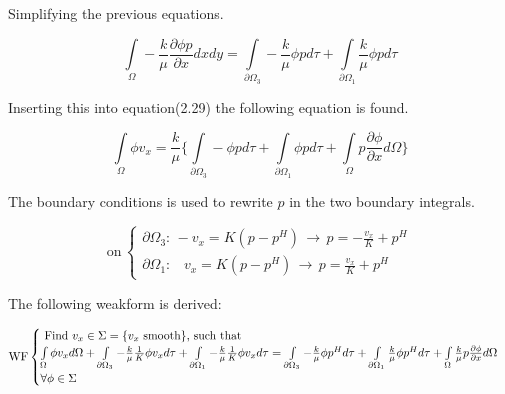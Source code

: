 \documentclass[a4paper]{report}
\begin{document}
Simplifying the previous equations.

\begin{equation}
\int\limits_{\Omega}-\frac{k}{\mu}\frac{\partial \phi p}{\partial x}dxdy =\int\limits_{\partial\Omega_3}-\frac{k}{\mu}\phi pd\tau+\int\limits_{\partial\Omega_1}\frac{k}{\mu}\phi pd\tau
\end{equation}

Inserting this into equation(2.29) the following equation is found.

\begin{equation}
	\int\limits_{\Omega}\phi v_x = \frac{k}{\mu}\{\int\limits_{\partial\Omega_3}-\phi pd\tau+\int\limits_{\partial\Omega_1}\phi pd\tau+\int\limits_{\Omega}p\frac{\partial \phi}{\partial x}d\Omega\}
\end{equation}

The boundary conditions is used to rewrite $p$ in the two boundary integrals.



\begin{equation}
\text{on}\,
\begin{cases}
\partial\Omega_3:\, -v_x=K(p-p^H) \,\rightarrow\, p=-\frac{v_x}{K}+p^H\\
\partial\Omega_1:\,\,\,\,\, v_x=K(p-p^H) \,\rightarrow\, p=\frac{v_x}{K}+p^H
\end{cases}
\end{equation}

The following weakform is derived:


\vspace{1mm}

\begin{equation}
\text{WF}
	\begin{cases}
	$ Find $v_x \in \Sigma = \{v_x \text{ smooth}\}$, such that$ \\
		\int\limits_{\Omega}\phi v_x d\Omega + \int\limits_{\partial \Omega_3}-\frac{k}{\mu}\frac{1}{K}\phi v_xd\tau + \int\limits_{\partial \Omega_1}-\frac{k}{\mu}\frac{1}{K}\phi v_x d\tau 
		= \int\limits_{\partial \Omega_3}-\frac{k}{\mu}\phi p^H d\tau +\int\limits_{\partial \Omega_1}\frac{k}{\mu}\phi p^H d\tau + \int\limits_{\Omega}\frac{k}{\mu}p\frac{\partial \phi}{\partial x}d\Omega \\
		\forall \phi \in \Sigma
	\end{cases}
\end{equation}
\end{document}
